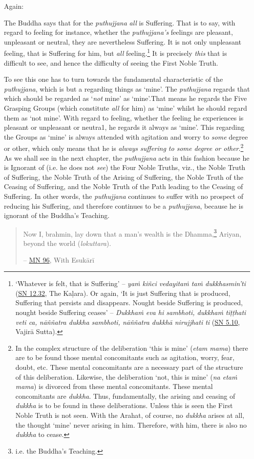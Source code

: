 Again:

The Buddha says that for the \textit{puthujjana} \emph{all} is Suffering. That is to say, with regard to feeling for instance, whether the \textit{puthujjana's} feelings are pleasant, unpleasant or neutral, they are nevertheless Suffering. It is not only unpleasant feeling, that is Suffering for him, but \emph{all} feeling.\footnote{`Whatever is felt, that is Suffering' -- \textit{yaṁ kiñci vedayitaṁ taṁ dukkhasmin'ti} (\href{https://suttacentral.net/sn12.32/en/bodhi}{SN 12.32}, The Kaḷara). Or again, `It is just Suffering that is produced, Suffering that persists and disappears. Nought beside Suffering is produced, nought beside Suffering ceases' -- \textit{Dukkhaṁ eva hi sambhoti, dukkhaṁ tiṭṭhati veti ca, nāññatra dukkha sambhoti, nāññatra dukkhā nirujjhati ti} (\href{https://suttacentral.net/sn5.10/en/bodhi}{SN 5.10}, Vajirā Sutta).} It is precisely \emph{this} that is difficult to see, and hence the difficulty of seeing the First Noble Truth.

To see this one has to turn towards the fundamental characteristic of the \textit{puthujjana}, which is but a regarding things as `mine'. The \textit{puthujjana} regards that which should be regarded as `\emph{not} mine' as `mine'.That means he regards the Five Grasping Groups (which constitute \emph{all} for him) as `mine' whilst he should regard them as `not mine'. With regard to feeling, whether the feeling he experiences is pleasant or unpleasant or neutra1, he regards it always as `mine'. This regarding the Groups as `mine' is always attended with agitation and worry to \emph{some} degree or other, which only means that he is \emph{always suffering to some degree or other}.\footnote{In the complex structure of the deliberation `this is mine' (\textit{etam mama}) there are to be found those mental concomitants such as agitation, worry, fear, doubt, etc. These mental concomitants are a necessary part of the structure of this deliberation. Likewise, the deliberation `not, this is mine' (\textit{na etaṁ mama}) is divorced from these mental concomitants. These mental concomitants are \textit{dukkha}. Thus, fundamentally, the arising and ceasing of \textit{dukkha} is to be found in these deliberations. Unless this is seen the First Noble Truth is not seen. With the Arahat, of course, no \textit{dukkha} arises at all, the thought `mine' never arising in him. Therefore, with him, there is also no \textit{dukkha} to cease.} As we shall see in the next chapter, the \textit{puthujjana} acts in this fashion because he is Ignorant of (i.e. he does not \emph{see}) the Four Noble Truths, viz., the Noble Truth of Suffering, the Noble Truth of the Arising of Suffering, the Noble Truth of the Ceasing of Suffering, and the Noble Truth of the Path leading to the Ceasing of Suffering. In other words, the \textit{puthujjana} continues to suffer with no prospect of reducing his Suffering, and therefore continues to be a \textit{puthujjana}, because he is ignorant of the Buddha's Teaching.

\begin{quote}
Now I, brahmin, lay down that a man's wealth is the Dhamma,\footnote{i.e. the Buddha's Teaching.} Ariyan, beyond the world (\textit{lokuttara}).

 -- \href{https://suttacentral.net/mn96/en/sujato}{MN 96}, With Esukārī
\end{quote}
